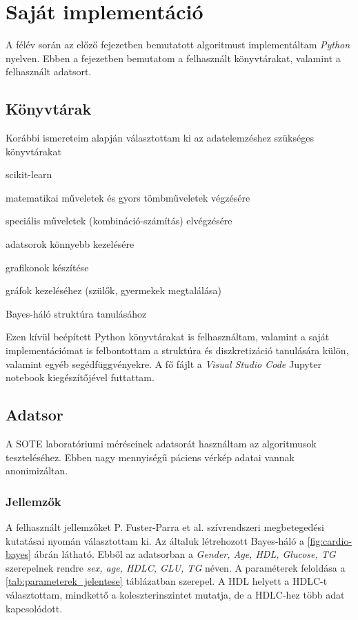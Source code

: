\chapter{Saját implementáció}

A félév során az előző fejezetben bemutatott algoritmust implementáltam \textit{Python} nyelven. Ebben a fejezetben bemutatom a felhasznált könyvtárakat, valamint a felhasznált adatsort.

\section{Könyvtárak}
Korábbi ismereteim alapján választottam ki az adatelemzéshez szükséges könyvtárakat

\begin{labeling}{scikit-learn}
\item[numpy] matematikai műveletek és gyors tömbműveletek végzésére
\item[scikit-learn] speciális műveletek (kombináció-számítás) elvégzésére
\item[pandas] adatsorok könnyebb kezelésére
\item[matplotlib] grafikonok készítése
\item[networkx] gráfok kezeléséhez (szülők, gyermekek megtalálása)
\item[pomegranate] Bayes-háló struktúra tanulásához
\end{labeling}

Ezen kívül beépített Python könyvtárakat is felhasználtam, valamint a saját implementációmat is felbontottam a struktúra és diszkretizáció tanulására külön, valamint egyéb segédfüggvényekre. A fő fájlt a \textit{Visual Studio Code} Jupyter notebook kiegészítőjével futtattam.

\section{Adatsor}
A SOTE laboratóriumi méréseinek adatsorát használtam az algoritmusok teszteléséhez. Ebben nagy mennyiségű páciens vérkép adatai vannak anonimizáltan. 

\subsection{Jellemzők}
A felhasznált jellemzőket P. Fuster-Parra et al. \cite{fuster2016bayesian} szívrendszeri megbetegedési kutatásai nyomán választottam ki. Az általuk létrehozott Bayes-háló a \ref{fig:cardio-bayes} ábrán látható. Ebből az adatsorban a \emph{Gender, Age, HDL, Glucose, TG} szerepelnek rendre \emph{sex, age, HDLC, GLU, TG} néven. A paraméterek feloldása a \ref{tab:parameterek_jelentese} táblázatban szerepel. A HDL helyett a HDLC-t választottam, mindkettő a koleszterinszintet mutatja, de a HDLC-hez több adat kapcsolódott.

